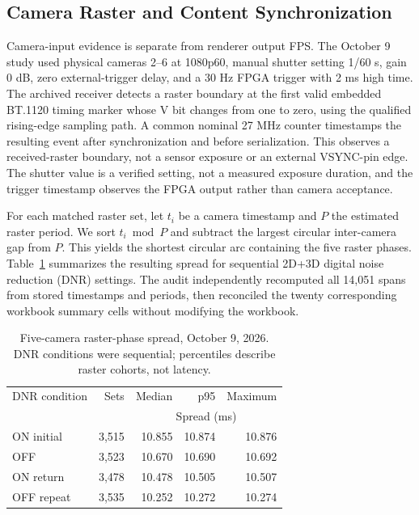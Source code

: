 \subsection{Camera Raster and Content Synchronization}
Camera-input evidence is separate from renderer output FPS. The October 9 study used physical cameras 2--6 at 1080p60, manual shutter setting 1/60 s, gain 0 dB, zero external-trigger delay, and a 30 Hz FPGA trigger with 2 ms high time. The archived receiver detects a raster boundary at the first valid embedded BT.1120 timing marker whose V bit changes from one to zero, using the qualified rising-edge sampling path. A common nominal 27 MHz counter timestamps the resulting event after synchronization and before serialization. This observes a received-raster boundary, not a sensor exposure or an external VSYNC-pin edge. The shutter value is a verified setting, not a measured exposure duration, and the trigger timestamp observes the FPGA output rather than camera acceptance.

For each matched raster set, let $t_i$ be a camera timestamp and $P$ the estimated raster period. We sort $t_i\bmod P$ and subtract the largest circular inter-camera gap from $P$. This yields the shortest circular arc containing the five raster phases. Table~\ref{tab:camera_sync} summarizes the resulting spread for sequential 2D+3D digital noise reduction (DNR) settings. The audit independently recomputed all 14,051 spans from stored timestamps and periods, then reconciled the twenty corresponding workbook summary cells without modifying the workbook.

\begin{table}[t]
\centering
\caption{Five-camera raster-phase spread, October 9, 2026. DNR conditions were sequential; percentiles describe raster cohorts, not latency.}
\label{tab:camera_sync}
\small
\begin{tabular}{lrrrr}
\toprule
DNR condition & Sets & Median & p95 & Maximum \\
 & & \multicolumn{3}{c}{Spread (ms)} \\
\midrule
ON initial & 3,515 & 10.855 & 10.874 & 10.876 \\
OFF & 3,523 & 10.670 & 10.690 & 10.692 \\
ON return & 3,478 & 10.478 & 10.505 & 10.507 \\
OFF repeat & 3,535 & 10.252 & 10.272 & 10.274 \\
\bottomrule
\end{tabular}
\end{table}

